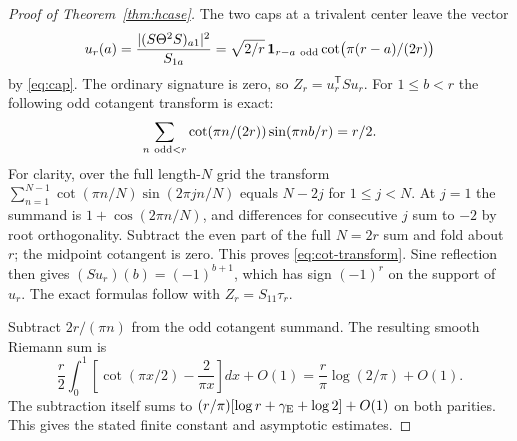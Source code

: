 \begin{proof}[Proof of Theorem~\ref{thm:hcase}]
The two caps at a trivalent center leave the vector
\[
 u_r(a)=\frac{|(S\Theta^2S)_{a1}|^2}{S_{1a}}
       =\sqrt{2/r}\,\mathbf1_{r-a\ {\rm odd}}
                      \cot\bigl(\pi(r-a)/(2r)\bigr)
\]
by \eqref{eq:cap}. The ordinary signature is zero, so \(Z_r=u_r^{\mathsf T}S u_r\). For \(1\le b<r\) the following odd cotangent transform is exact:
\begin{equation}\label{eq:cot-transform}
 \sum_{n\ {\rm odd}<r}\cot(\pi n/(2r))\sin(\pi nb/r)=r/2.
\end{equation}
For clarity, over the full length-\(N\) grid the transform
\(\sum_{n=1}^{N-1}\cot(\pi n/N)\sin(2\pi jn/N)\) equals \(N-2j\) for \(1\le j<N\). At \(j=1\) the summand is \(1+\cos(2\pi n/N)\), and differences for consecutive \(j\) sum to \(-2\) by root orthogonality. Subtract the even part of the full \(N=2r\) sum and fold about \(r\); the midpoint cotangent is zero. This proves \eqref{eq:cot-transform}. Sine reflection then gives \((Su_r)(b)=(-1)^{b+1}\), which has sign \((-1)^r\) on the support of \(u_r\). The exact formulas follow with \(Z_r=S_{11}\tau_r\).

Subtract \(2r/(\pi n)\) from the odd cotangent summand. The resulting smooth Riemann sum is
\[
 \frac r2\int_0^1\left[\cot(\pi x/2)-\frac{2}{\pi x}\right]dx+O(1)
       =\frac r\pi\log(2/\pi)+O(1).
\]
The subtraction itself sums to \((r/\pi)[\log r+\gamma_{\rm E}+\log2]+O(1)\) on both parities. This gives the stated finite constant and asymptotic estimates.
\end{proof}
